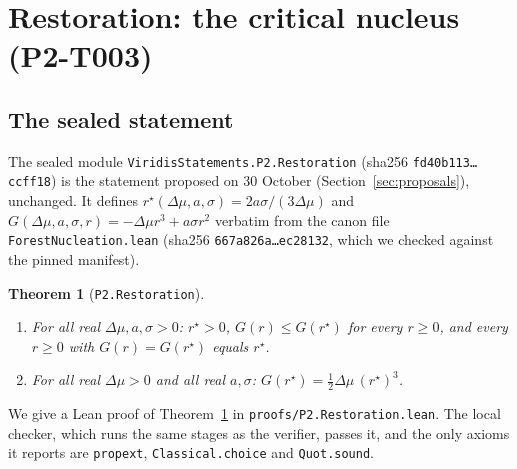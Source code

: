 \documentclass[11pt]{article}
\newtheorem{theorem}{Theorem}
\theoremstyle{definition}
\theoremstyle{remark}
\begin{document}
\section{Restoration: the critical nucleus (P2-T003)}\label{sec:restoration}
\subsection{The sealed statement}
The sealed module \texttt{ViridisStatements.P2.Restoration} (sha256 \texttt{fd40b113\ldots ccff18}) is the statement
proposed on 30 October (Section~\ref{sec:proposals}), unchanged.
It defines $r^\star(\Delta\mu,a,\sigma)=2a\sigma/(3\Delta\mu)$ and $G(\Delta\mu,a,\sigma,r)=-\Delta\mu r^3+a\sigma r^2$
verbatim from the canon file \texttt{ForestNucleation.lean} (sha256 \texttt{667a826a\ldots ec28132}, which we checked
against the pinned manifest).
\begin{theorem}[\texttt{P2.Restoration}]\label{thm:restoration}
\begin{enumerate}
\item[(i)] For all real $\Delta\mu,a,\sigma>0$: $r^\star>0$, $G(r)\le G(r^\star)$ for every $r\ge 0$, and every $r\ge0$ with
$G(r)=G(r^\star)$ equals $r^\star$.
\item[(ii)] For all real $\Delta\mu>0$ and all real $a,\sigma$: $G(r^\star)=\tfrac12\Delta\mu\,(r^\star)^3$.
\end{enumerate}
\end{theorem}
We give a Lean proof of Theorem~\ref{thm:restoration} in \texttt{proofs/P2.Restoration.lean}.
The local checker, which runs the same stages as the verifier, passes it, and the only axioms it reports are
\texttt{propext}, \texttt{Classical.choice} and \texttt{Quot.sound}.
\end{document}
